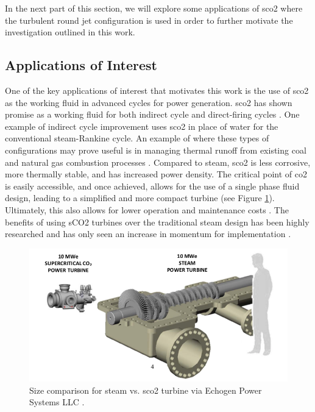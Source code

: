 In the next part of this section, we will explore some applications of \gls{sco2} where the turbulent round jet configuration is used in order to further motivate the investigation outlined in this work. 

\subsection{Applications of Interest}
One of the key applications of interest that motivates this work is the use of \gls{sco2} as the working fluid in advanced cycles for power generation. \gls{sco2} has shown promise as a working fluid for both indirect cycle and direct-firing cycles \cite{WEILAND2017293, WHITE2021116447}. One example of indirect cycle improvement uses \gls{sco2} in place of water for the conventional steam-Rankine cycle. An example of where these types of configurations may prove useful is in managing thermal runoff from existing coal and natural gas combustion processes \cite{WEILAND2017293}. Compared to steam, \gls{sco2} is less corrosive, more thermally stable, and has increased power density. The critical point of \gls{co2} is easily accessible, and once achieved, allows for the use of a single phase fluid design, leading to a simplified and more compact turbine (see Figure \ref{turbine_comp}). Ultimately, this also allows for lower operation and maintenance costs \cite{Dodge}. The benefits of using sCO2 turbines over the traditional steam design has been highly researched and has only seen an increase in momentum for implementation \cite{CRESPI2017152, NextGenNucReac, Dodge, commercialization}. 

\begin{figure}[h!]
\begin{center}
\includegraphics[scale=.5]{figures/steam_vs_sco2_turbine}
\end{center}
\caption{Size comparison for steam vs. \gls{sco2} turbine via Echogen Power Systems LLC \cite{commercialization}.}
\label{turbine_comp}
\end{figure}

